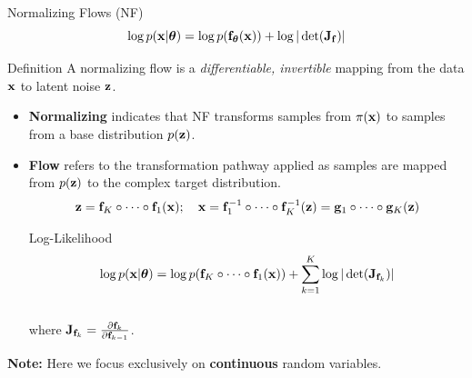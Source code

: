 \documentclass{beamer}
\begin{document}
\begin{frame}{Normalizing Flows (NF)}
	\vspace{-0.3cm}
	\[
	\log p(\mathbf{x}|\boldsymbol{\theta}) = \log p(\mathbf{f}_{\boldsymbol{\theta}}(\mathbf{x})) + \log |\det (\mathbf{J}_{\mathbf{f}})|
	\]
	\vspace{-0.4cm}
	\begin{block}{Definition}
		A normalizing flow is a \textit{differentiable, invertible} mapping from the data $\mathbf{x}$ to latent noise $\mathbf{z}$.
	\end{block}
	\begin{itemize}
		\item \textbf{Normalizing} indicates that NF transforms samples from $\pi(\mathbf{x})$ to samples from a base distribution $p(\mathbf{z})$.
		\item \textbf{Flow} refers to the transformation pathway applied as samples are mapped from $p(\mathbf{z})$ to the complex target distribution.
		\[
		\mathbf{z} = \mathbf{f}_K \circ \dots \circ \mathbf{f}_1(\mathbf{x}); \quad \mathbf{x} = \mathbf{f}_1^{-1} \circ \dots \circ \mathbf{f}_K^{-1} (\mathbf{z}) = \mathbf{g}_1 \circ \dots \circ \mathbf{g}_K(\mathbf{z}) 
		\] 
		\vspace{-0.4cm}
		\begin{block}{Log-Likelihood}
			\vspace{-0.4cm}
			\[
			\log p(\mathbf{x}|\boldsymbol{\theta}) = \log p(\mathbf{f}_K \circ \dots \circ \mathbf{f}_1(\mathbf{x})) + \sum_{k=1}^K \log |\det (\mathbf{J}_{\mathbf{f}_k})|
			\]
			\vspace{-0.4cm} \\
			where $\mathbf{J}_{\mathbf{f}_k} = \frac{\partial \mathbf{f}_k}{\partial \mathbf{f}_{k-1}}$.
		\end{block}
	\end{itemize}
	\textbf{Note:} Here we focus exclusively on \textbf{continuous} random variables.
\end{frame}
\end{document}
